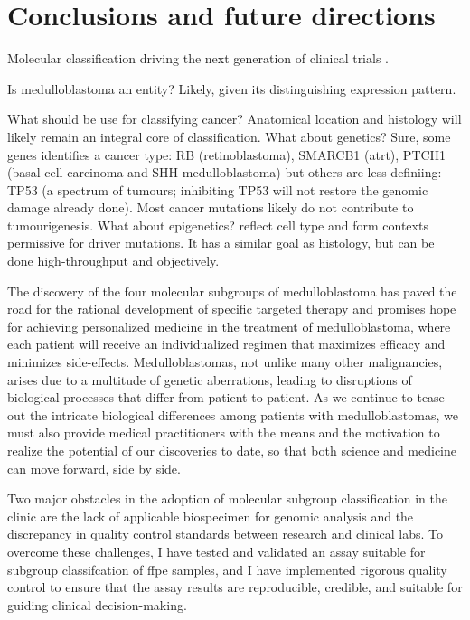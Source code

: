 \chapter{Conclusions and future directions}
\label{ch:conclusion}

Molecular classification driving the next generation of clinical trials .

Is medulloblastoma an entity?
Likely, given its distinguishing expression pattern.

What should be use for classifying cancer?
Anatomical location and histology will likely remain an integral core of classification.
What about genetics? Sure, some genes identifies a cancer type: RB (retinoblastoma), SMARCB1 (\gls{atrt}), PTCH1 (basal cell carcinoma and SHH medulloblastoma) but others are less definiing: TP53 (a spectrum of tumours; inhibiting TP53 will not restore the genomic damage already done). Most cancer mutations likely do not contribute to tumourigenesis.
What about epigenetics? reflect cell type and form contexts permissive for driver mutations. It has a similar goal as histology, but can be done high-throughput and objectively.

The discovery of the four molecular subgroups of medulloblastoma has paved the road for the rational development of specific targeted therapy and promises hope for achieving personalized medicine in the treatment of medulloblastoma, where each patient will receive an individualized regimen that maximizes efficacy and minimizes side-effects. Medulloblastomas, not unlike many other malignancies, arises due to a multitude of genetic aberrations, leading to disruptions of biological processes that differ from patient to patient. As we continue to tease out the intricate biological differences among patients with medulloblastomas, we must also provide medical practitioners with the means and the motivation to realize the potential of our discoveries to date, so that both science and medicine can move forward, side by side.

Two major obstacles in the adoption of molecular subgroup classification in the clinic are the lack of applicable biospecimen for genomic analysis and the discrepancy in quality control standards between research and clinical labs. To overcome these challenges, I have tested and validated an assay suitable for subgroup classifcation of \gls{ffpe} samples, and I have implemented rigorous quality control to ensure that the assay results are reproducible, credible, and suitable for guiding clinical decision-making.


